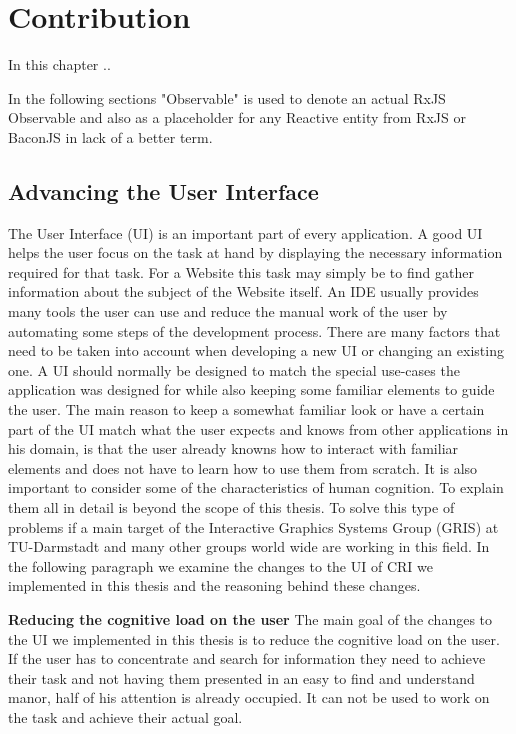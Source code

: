 \chapter{Contribution}
In this chapter ..

In the following sections "Observable" is used to denote an actual RxJS Observable and also as a placeholder for any Reactive entity from RxJS or BaconJS in lack of a better term.

\section{Advancing the User Interface}
The User Interface (UI) is an important part of every application. A good UI helps the user focus on the task at hand by displaying the necessary information required for that task. For a Website this task may simply be to find gather information about the subject of the Website itself. An IDE usually provides many tools the user can use and reduce the manual work of the user by automating some steps of the development process. There are many factors that need to be taken into account when developing a new UI or changing an existing one. A UI should normally be designed to match the special use-cases the application was designed for while also keeping some familiar elements to guide the user. The main reason to keep a somewhat familiar look or have a certain part of the UI match what the user expects and knows from other applications in his domain, is that the user already knowns how to interact with familiar elements and does not have to learn how to use them from scratch. It is also important to consider some of the characteristics of human cognition. To explain them all in detail is beyond the scope of this thesis. To solve this type of problems if a main target of the Interactive Graphics Systems Group (GRIS) at TU-Darmstadt and many other groups world wide are working in this field. In the following paragraph we examine the changes to the UI of CRI we implemented in this thesis and the reasoning behind these changes.
  
\textbf{Reducing the cognitive load on the user}
The main goal of the changes to the UI we implemented in this thesis is to reduce the cognitive load on the user. If the user has to concentrate and search for information they need to achieve their task and not having them presented in an easy to find and understand manor, half of his attention is already occupied. It can not be used to work on the task and achieve their actual goal.

